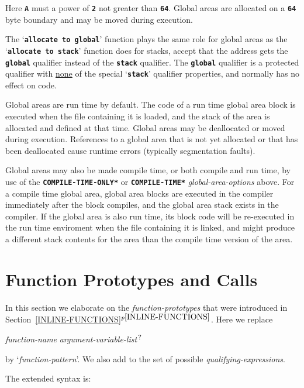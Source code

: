 \documentclass[12pt]{article}
\newcommand{\TT}[1]{{\tt \bfseries #1}}
\newcommand{\itemref}[1]{\ref{#1}$^{p\pageref{#1}}$}
\newcommand{\EOL}{\penalty \exhyphenpenalty}
\newcommand{\QMARK}{{$^{\,\mbox{\footnotesize ?}}$}}
\begin{document}
Here \TT{A} must a power of \TT{2} not greater than \TT{64}.
Global areas are allocated on a \TT{64} byte boundary and
may be moved during execution.

The `\TT{allocate to global}' function plays the same role for
global areas as the `\TT{allocate to stack}' function does for
stacks, accept that the address gets the \TT{global} qualifier
instead of the \TT{stack} qualifier.  The \TT{global} qualifier
is a protected qualifier with \underline{none} of the special `\TT{stack}'
qualifier properties, and normally has no effect on code.

Global areas are run time by default.
The code of a run time
global area block is executed when the file containing it is
loaded, and the stack of the area is allocated and defined at that
time.  Global areas may be deallocated or moved during execution.
References to a global area
that is not yet allocated or that has been deallocated cause runtime
errors (typically segmentation faults).

Global areas may also be made compile time, or both compile and run time,
by use of the \TT{*COM\-PILE-\EOL TIME-\EOL ONLY*} or \TT{*COMPILE-\EOL TIME*}
{\em global-\EOL area-\EOL options} above.  For a compile time
global area, global area blocks are executed in the compiler immediately
after the block compiles, and the global area stack exists in the compiler.
If the global area is also run time, its
block code will be re-executed in the run time enviroment when the
file containing it is linked, and might produce a different stack contents
for the area than the compile time version of the area.

\section{Function Prototypes and Calls}
\label{FUNCTION-PROTOTYPES-AND-CALLS}

In this section we elaborate on the {\em function-prototypes} that were
introduced in Section~\itemref{INLINE-FUNCTIONS}.   Here we replace
\begin{center}
{\em function-name} {\em argument-variable-list}\QMARK{}
\end{center}
by `{\em function-pattern}'.  We also add to the set of possible
{\em qualifying-expressions}.

The extended syntax is:
\end{document}
